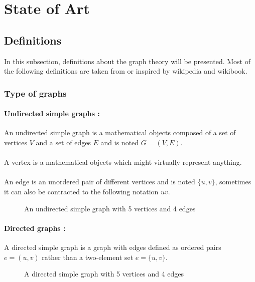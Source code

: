 \section{State of Art}
\subsection{Definitions}
In this subsection, definitions about the graph theory will be presented. Most
of the following definitions are taken from or inspired by wikipedia and
wikibook.

\subsubsection{Type of graphs}
\paragraph{Undirected simple graphs :}
An undirected simple graph is a mathematical objects composed of a set of
vertices $V$ and a set of edges $E$ and is noted $G = (V,E)$.

\paragraph{}
A vertex is a mathematical objects which might virtually represent anything.

\paragraph{}
An edge is an unordered pair of different vertices and is noted $\{u,v\}$,
sometimes it can also be contracted to the following notation $uv$.

\begin{figure}[!h]
  \begin{center}
    
  \end{center}
  \caption{An undirected simple graph with 5 vertices and 4 edges}
\end{figure}

\paragraph{Directed graphs :} 
A directed simple graph is a graph with edges defined as ordered pairs
$e = (u,v)$ rather than a two-element set $e = \{u,v\}$.
\begin{figure}[!h]
  \begin{center}
    
  \end{center}
  \caption{A directed simple graph with 5 vertices and 4 edges}
\end{figure}

